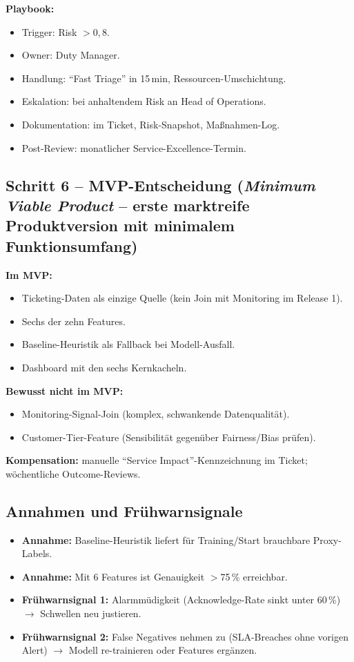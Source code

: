 \documentclass[11pt,a4paper,oneside]{article}
\begin{document}
\textbf{Playbook:}
\begin{itemize}
  \item Trigger: Risk $>0,8$.
  \item Owner: Duty Manager.
  \item Handlung: ``Fast Triage'' in 15\,min, Ressourcen-Umschichtung.
  \item Eskalation: bei anhaltendem Risk an Head of Operations.
  \item Dokumentation: im Ticket, Risk-Snapshot, Maßnahmen-Log.
  \item Post-Review: monatlicher Service-Excellence-Termin.
\end{itemize}

\subsection{Schritt 6 -- MVP-Entscheidung (\emph{Minimum Viable Product} -- erste marktreife Produktversion mit minimalem Funktionsumfang)}

\textbf{Im MVP:}
\begin{itemize}
  \item Ticketing-Daten als einzige Quelle (kein Join mit Monitoring im Release 1).
  \item Sechs der zehn Features.
  \item Baseline-Heuristik als Fallback bei Modell-Ausfall.
  \item Dashboard mit den sechs Kernkacheln.
\end{itemize}

\textbf{Bewusst nicht im MVP:}
\begin{itemize}
  \item Monitoring-Signal-Join (komplex, schwankende Datenqualität).
  \item Customer-Tier-Feature (Sensibilität gegenüber Fairness/Bias prüfen).
\end{itemize}

\textbf{Kompensation:} manuelle ``Service Impact''-Kennzeichnung im Ticket; wöchentliche Outcome-Reviews.

\subsection{Annahmen und Frühwarnsignale}

\begin{itemize}
  \item \textbf{Annahme:} Baseline-Heuristik liefert für Training/Start brauchbare Proxy-Labels.
  \item \textbf{Annahme:} Mit 6 Features ist Genauigkeit $>$75\,\% erreichbar.
  \item \textbf{Frühwarnsignal 1:} Alarmmüdigkeit (Acknowledge-Rate sinkt unter 60\,\%) $\rightarrow$ Schwellen neu justieren.
  \item \textbf{Frühwarnsignal 2:} False Negatives nehmen zu (SLA-Breaches ohne vorigen Alert) $\rightarrow$ Modell re-trainieren oder Features ergänzen.
\end{itemize}
\end{document}
